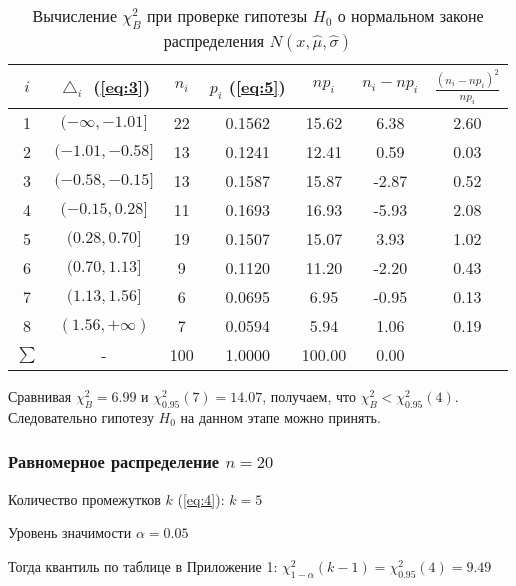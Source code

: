 \documentclass[a4paper, 12pt]{article}
\begin{document}
\begin{table} [H]
\begin{center}
\begin{tabular}{|c|c|c|c|c|c|c|}
\hline 
$i$ & $\bigtriangleup_i$ (\ref{eq:3}) & $n_i$ & $p_i$ (\ref{eq:5}) & $np_i$ & $n_i - np_i$ & $\frac{(n_i-np_i)^2}{np_i}$ \\ 
\hline 
1 & $(-\infty, -1.01]$ & 22 & 0.1562 & 15.62 & 6.38 & 2.60 \\ 
\hline 
2 & $(-1.01, -0.58]$ & 13 & 0.1241 & 12.41 & 0.59 & 0.03 \\ 
\hline 
3 & $(-0.58, -0.15]$ & 13 & 0.1587 & 15.87 & -2.87 & 0.52 \\ 
\hline 
4 & $(-0.15, 0.28]$ & 11 & 0.1693 & 16.93 & -5.93 & 2.08 \\ 
\hline 
5 & $(0.28, 0.70]$ & 19 & 0.1507 & 15.07 & 3.93 & 1.02 \\ 
\hline 
6 & $(0.70, 1.13]$ & 9 & 0.1120 & 11.20 & -2.20 & 0.43 \\ 
\hline 
7 & $(1.13, 1.56]$ & 6 & 0.0695 & 6.95 & -0.95 & 0.13 \\ 
\hline 
8 & $(1.56, +\infty)$ & 7 & 0.0594 & 5.94 & 1.06 & 0.19 \\ 
\hline 
$\sum$ & - & 100 & 1.0000 & 100.00 & 0.00 & \color{red}{$6.99= \chi^2_B$} \\ 
\hline 
\end{tabular}
\caption{Вычисление $\chi^2_B$ при проверке гипотезы $H_0$ о нормальном законе распределения $N(x,\widehat{\mu}, \widehat{\sigma})$} 
\end{center}
\end{table}
Сравнивая $\chi^2_B = 6.99$ и $\chi^2_0.95(7) = 14.07$, получаем, что $\chi^2_B < \chi^2_0.95(4)$. Следовательно гипотезу $H_0$ на данном этапе можно принять.

\subsubsection{Равномерное распределение $n=20$}

Количество промежутков $k$ (\ref{eq:4}): $k = 5$

Уровень значимости $\alpha = 0.05$

Тогда квантиль по таблице в Приложение 1: $\chi^2_{1-\alpha}(k-1) = \chi^2_0.95(4) = 9.49$
\end{document}
